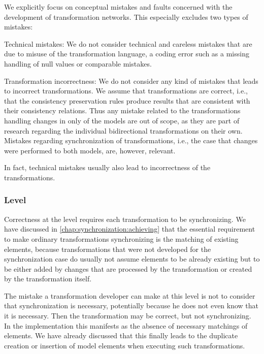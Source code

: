 We explicitly focus on conceptual mistakes and faults concerned with the development of transformation networks.
This especially excludes two types of mistakes:
\begin{properdescription}
    \item[Technical mistakes:] We do not consider technical and careless mistakes that are due to misuse of the transformation language, a coding error such as a missing handling of null values or comparable mistakes.
    \item[Transformation incorrectness:] We do not consider any kind of mistakes that leads to incorrect transformations. We assume that transformations are correct, i.e., that the consistency preservation rules produce results that are consistent with their consistency relations. Thus any mistake related to the transformations handling changes in only of the models are out of scope, as they are part of research regarding the individual bidirectional transformations on their own. Mistakes regarding synchronization of transformations, i.e., the case that changes were performed to both models, are, however, relevant.
\end{properdescription}
In fact, technical mistakes usually also lead to incorrectness of the transformations.


\subsubsection*{\LevelTransformation Level}

Correctness at the \leveltransformation level requires each transformation to be synchronizing.
We have discussed in \autoref{chap:synchronization:achieving} that the essential requirement to make ordinary transformations synchronizing is the matching of existing elements, because transformations that were not developed for the synchronization case do usually not assume elements to be already existing but to be either added by changes that are processed by the transformation or created by the transformation itself.

The mistake a transformation developer can make at this level is not to consider that synchronization is necessary, potentially because he does not even know that it is necessary. Then the transformation may be correct, but not synchronizing.
In the implementation this manifests as the absence of necessary matchings of elements.
We have already discussed that this finally leads to the duplicate creation or insertion of model elements when executing such transformations.


